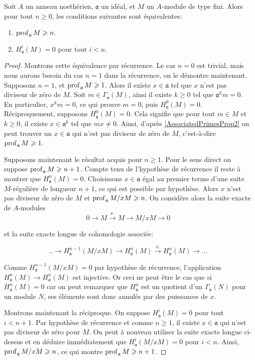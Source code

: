 \begin{prop}
Soit $A$ un anneau noethérien, $\mathfrak{a}$ un idéal, et $M$ un $A$-module de type fini. Alors pour tout $n\geq 0$, les conditions suivantes sont équivalentes:
\begin{enumerate}
\item $\operatorname{prof}_\mathfrak{a} M\geqslant n$.
\item $H_\mathfrak{a}^i(M)=0$ pour tout $i<n$.
\end{enumerate}
\end{prop}
\begin{proof}
Montrons cette équivalence par récurrence. Le cas $n=0$ est trivial, mais nous aurons besoin du cas $n=1$ dans la récurrence, on le démontre maintenant. Supposons $n=1$, et $\operatorname{prof}_\mathfrak{a} M\geqslant 1$. Alors il existe $x\in\mathfrak{a}$ tel que $x$ n'est pas diviseur de zéro de $M$. Soit $m\in \Gamma_ \mathfrak{a}(M)$, ainsi il existe $k\geq 0$ tel que $\mathfrak{a}^k m=0$. En particulier, $x^km=0$, ce qui prouve $m=0$, puis $H^0_\mathfrak{a}(M)=0$. Réciproquement, supposons $H^0_\mathfrak{a}(M)=0$. Cela signifie que pour tout $m\in M$ et $k\geq 0$, il existe $x\in \mathfrak{a}^k$ tel que $mx\neq 0$. Ainsi, d'après \ref{AssociatedPrimesProp2} on peut trouver un $x\in \mathfrak{a}$ qui n'est pas diviseur de zéro de $M$, c'est-à-dire $\operatorname{prof}_\mathfrak{a}M\geqslant 1$.

Supposons maintenant le résultat acquis pour $n\geq 1$. Pour le sens direct on suppose $\operatorname{prof}_\mathfrak{a} M\geqslant n+1$. Compte tenu de l'hypothèse de récurrence il reste à montrer que $H^n_\mathfrak{a}(M)=0$. Choisissons $x\in \mathfrak{a}$ égal au premier terme d'une suite $M$-régulière de longueur $n+1$, ce qui est possible par hypothèse. Alors $x$ n'est pas diviseur de zéro de $M$ et $\operatorname{prof}_\mathfrak{a} M/xM \geqslant n$. On considère alors la suite exacte de $A$-modules
$$0\rightarrow M \xrightarrow{x.} M\rightarrow M/xM\rightarrow 0$$

\noindent et la suite exacte longue de cohomologie associée:

$$..\rightarrow H^{n-1}_\mathfrak{a}(M/xM) \rightarrow H^n_\mathfrak{a}(M) \xrightarrow{x.}  H^n_\mathfrak{a}(M) \rightarrow ...$$

\noindent Comme $H^{n-1}_\mathfrak{a}(M/xM)=0$ par hypothèse de récurrence, l'application $H^n_\mathfrak{a}(M) \rightarrow  H^n_\mathfrak{a}(M)$ est injective. Or ceci ne peut être le cas que si $H^n_\mathfrak{a}(M)=0$ car on peut remarquer que $H^n_\mathfrak{a}$ est un quotient d'un $\Gamma_\mathfrak{a}(N)$ pour un module $N$, ses éléments sont donc annulés par des puissances de $x$. 

Montrons maintenant la réciproque. On suppose $H^i_\mathfrak{a}(M)=0$ pour tout $i<n+1$. Par hypothèse de récurrence et comme $n\geq 1$, il existe $x\in \mathfrak{a}$ qui n'est pas diviseur de zéro pour $M$. On peut à nouveau utiliser la suite exacte longue ci-dessus et en déduire immédiatement que $H^{i}_\mathfrak{a}(M/xM)=0$ pour $i<n$. Ainsi, $\operatorname{prof}_\mathfrak{a} M/xM\geqslant n$, ce qui montre $\operatorname{prof}_\mathfrak{a} M \geqslant n+1$.
\end{proof}

